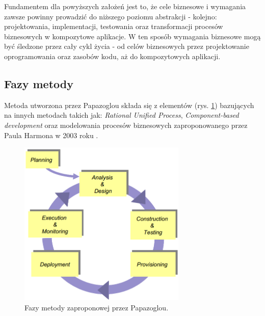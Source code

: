 Fundamentem dla powyższych założeń jest to, że cele biznesowe i wymagania zawsze powinny prowadzić do niższego poziomu abstrakcji - kolejno: projektowania, implementacji, testowania oraz transformacji procesów biznesowych w kompozytowe aplikacje. W ten sposób wymagania biznesowe mogą 
być śledzone przez cały cykl życia - od celów biznesowych przez projektowanie oprogramowania oraz zasobów kodu, aż do kompozytowych aplikacji.

\subsection{Fazy metody}
Metoda utworzona przez Papazoglou składa się z elementów (rys. \ref{papazoglou_method_phases}) bazujących na innych metodach takich jak: \emph{Rational Unified Process}, \emph{Component-based development} oraz modelowania procesów biznesowych zaproponowanego przez Paula Harmona w 2003 roku \cite{PapaZog}. 

\begin{figure}[h!tbp]
\begin{centering}
\includegraphics[width=8cm]{img/papazoglou_metoda_fazy.png}
\caption[Fazy metody zaproponowej przez Papazoglou.]{Fazy metody zaproponowej przez Papazoglou. \cite{PapaZog}}\label{papazoglou_method_phases}
\end{centering}
\end{figure} 

